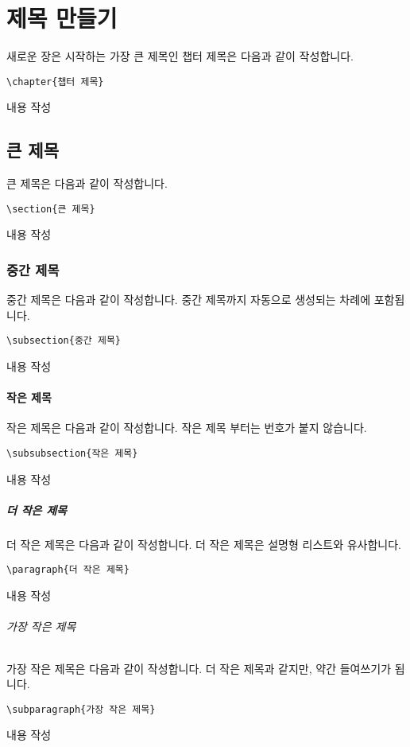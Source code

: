
\chapter{제목 만들기}
새로운 장은 시작하는 가장 큰 제목인 챕터 제목은 다음과 같이 작성합니다.
\begin{verbatim}
\chapter{챕터 제목}
\end{verbatim}
내용 작성

\section{큰 제목}
큰 제목은 다음과 같이 작성합니다.
\begin{verbatim}
\section{큰 제목}
\end{verbatim}
내용 작성

\subsection{중간 제목}
중간 제목은 다음과 같이 작성합니다. 중간 제목까지 자동으로 생성되는 차례에 포함됩니다.
\begin{verbatim}
\subsection{중간 제목}
\end{verbatim}
내용 작성

\subsubsection{작은 제목}
작은 제목은 다음과 같이 작성합니다. 작은 제목 부터는 번호가 붙지 않습니다.
\begin{verbatim}
\subsubsection{작은 제목}
\end{verbatim}
내용 작성

\paragraph{더 작은 제목}
더 작은 제목은 다음과 같이 작성합니다. 더 작은 제목은 설명형 리스트와 유사합니다.
\begin{verbatim}
\paragraph{더 작은 제목}
\end{verbatim}
내용 작성

\subparagraph{가장 작은 제목}
가장 작은 제목은 다음과 같이 작성합니다. 더 작은 제목과 같지만, 약간 들여쓰기가 됩니다.
\begin{verbatim}
\subparagraph{가장 작은 제목}
\end{verbatim}
내용 작성
